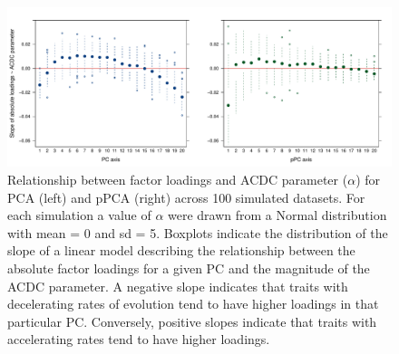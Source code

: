 \documentclass[a4paper,11pt]{article}
\begin{document}
\begin{figure}[p]
\centering
\includegraphics[scale=0.52]{./fig/acdc_slopes.pdf}
\caption{Relationship between factor loadings and ACDC parameter ($\alpha$) for PCA (left) and pPCA (right) across 100 simulated datasets. For each simulation a value of $\alpha$ were drawn from a Normal distribution with mean = 0 and sd = 5. Boxplots indicate the distribution of the slope of a linear model describing the relationship between the absolute factor loadings for a given PC and the magnitude of the ACDC parameter. A negative slope indicates that traits with decelerating rates of evolution tend to have higher loadings in that particular PC. Conversely, positive slopes indicate that traits with accelerating rates tend to have higher loadings.}
\label{ACDC}
\end{figure}
\end{document}

